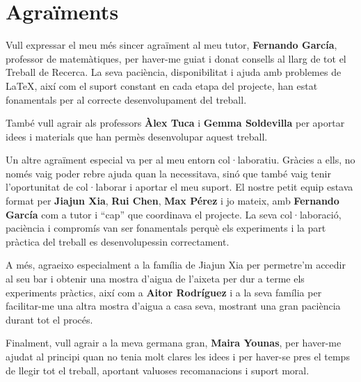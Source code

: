 \chapter*{Agraïments}

Vull expressar el meu més sincer agraïment al meu tutor, \textbf{Fernando García}, professor de matemàtiques, per haver-me guiat i donat consells al llarg de tot el Treball de Recerca. La seva paciència, disponibilitat i ajuda amb problemes de LaTeX, així com el suport constant en cada etapa del projecte, han estat fonamentals per al correcte desenvolupament del treball.

També vull agrair als professors \textbf{Àlex Tuca} i \textbf{Gemma Soldevilla} per aportar idees i materials que han permès desenvolupar aquest treball.

Un altre agraïment especial va per al meu entorn col·laboratiu. Gràcies a ells, no només vaig poder rebre ajuda quan la necessitava, sinó que també vaig tenir l’oportunitat de col·laborar i aportar el meu suport. El nostre petit equip estava format per \textbf{Jiajun Xia}, \textbf{Rui Chen}, \textbf{Max Pérez} i jo mateix, amb \textbf{Fernando García} com a tutor i “cap” que coordinava el projecte. La seva col·laboració, paciència i compromís van ser fonamentals perquè els experiments i la part pràctica del treball es desenvolupessin correctament.

A més, agraeixo especialment a la família de Jiajun Xia per permetre’m accedir al seu bar i obtenir una mostra d’aigua de l’aixeta per dur a terme els experiments pràctics, així com a \textbf{Aitor Rodríguez} i a la seva família per facilitar-me una altra mostra d’aigua a casa seva, mostrant una gran paciència durant tot el procés.

Finalment, vull agrair a la meva germana gran, \textbf{Maira Younas}, per haver-me ajudat al principi quan no tenia molt clares les idees i per haver-se pres el temps de llegir tot el treball, aportant valuoses recomanacions i suport moral.

